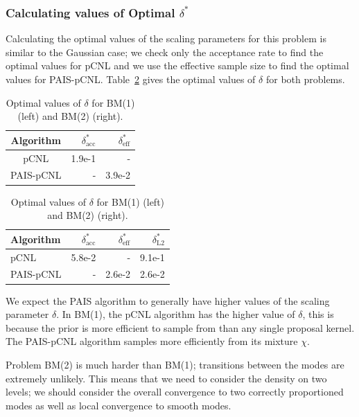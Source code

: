 \documentclass[final]{siamltex}
\begin{document}
\subsubsection{Calculating values of Optimal $\delta^*$}\label{sec:BM1_opt_delta}

Calculating the optimal values of the scaling parameters for this problem is similar to the Gaussian case; we check only the acceptance rate to find the optimal values for pCNL and we use the effective sample size to find the optimal values for PAIS-pCNL. Table~\ref{table:BM_opt_delta} gives the optimal values of $\delta$ for both problems.

\begin{table}[!htb]
    \begin{minipage}{.5\linewidth}
      \centering
        \begin{tabular}{|c|r|r|}
	\hline
	Algorithm							& $\delta^*_{\text{acc}}$	& $\delta^*_{\text{eff}}$ \\ \hline
	pCNL								& 1.9e-1					& - \\
	PAIS-pCNL							& -						& 3.9e-2\\
	\hline
	\end{tabular}
    \end{minipage}%
    \begin{minipage}{.5\linewidth}
      \centering
        \begin{tabular}{|l|r|r|r|}
	\hline
	Algorithm							& $\delta^*_{\text{acc}}$	& $\delta^*_{\text{eff}}$	& $\delta^*_{\text{L2}}$ \\ \hline
	pCNL								& 5.8e-2					& - 						& 9.1e-1\\
	PAIS-pCNL							& -						& 2.6e-2 					& 2.6e-2\\
	\hline
	\end{tabular}
    \end{minipage}
	\caption{Optimal values of $\delta$ for BM(1) (left) and BM(2) (right).}
	\label{table:BM_opt_delta}
\end{table}

We expect the PAIS algorithm to generally have higher values of the scaling parameter $\delta$. In BM(1), the pCNL algorithm has the higher value of $\delta$, this is because the prior is more efficient to sample from than any single proposal kernel. The PAIS-pCNL algorithm samples more efficiently from its mixture $\chi$.

Problem BM(2) is much harder than BM(1); transitions between the modes are extremely unlikely. This means that we need to consider the density on two levels; we should consider the overall convergence to two correctly proportioned modes as well as local convergence to smooth modes.
\end{document}
